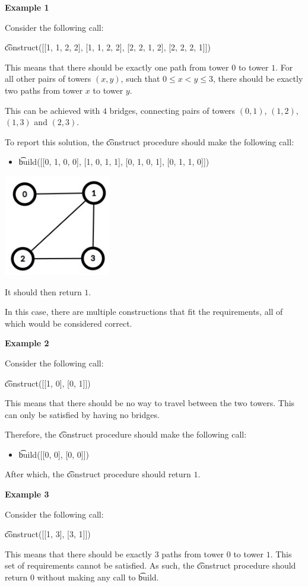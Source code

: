 \textbf{Example 1}

Consider the following call:

\t{construct([[1, 1, 2, 2], [1, 1, 2, 2], [2, 2, 1, 2], [2, 2, 2, 1]])}

This means that there should be exactly one path from tower $0$ to tower $1$. For all other pairs of towers $(x, y)$, such that $0 \leq x < y \leq 3$, there should be exactly two paths from tower $x$ to tower $y$.

This can be achieved with $4$ bridges, connecting pairs of towers $(0, 1)$, $(1, 2)$, $(1, 3)$ and $(2, 3)$.

To report this solution, the \t{construct} procedure should make the following call:
\begin{itemize}
\item \t{build([[0, 1, 0, 0], [1, 0, 1, 1], [0, 1, 0, 1], [0, 1, 1, 0]])}
\end{itemize}

\includegraphics{Supertrees.png}

It should then return $1$.

In this case, there are multiple constructions that fit the requirements, all of which would be considered correct.

\textbf{Example 2}

Consider the following call:

\t{construct([[1, 0], [0, 1]])}

This means that there should be no way to travel between the two towers. This can only be satisfied by having no bridges.

Therefore, the \t{construct} procedure should make the following call:
\begin{itemize}
\item \t{build([[0, 0], [0, 0]])}
\end{itemize}

After which, the \t{construct} procedure should return $1$.

\textbf{Example 3}

Consider the following call:

\t{construct([[1, 3], [3, 1]])}

This means that there should be exactly $3$ paths from tower $0$ to tower $1$. This set of requirements cannot be satisfied.
As such, the \t{construct} procedure should return $0$ without making any call to \t{build}.
